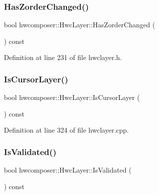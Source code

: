 \subsubsection{\texorpdfstring{Has\+Zorder\+Changed()}{HasZorderChanged()}}
{\footnotesize\ttfamily bool hwcomposer\+::\+Hwc\+Layer\+::\+Has\+Zorder\+Changed (\begin{DoxyParamCaption}{ }\end{DoxyParamCaption}) const\hspace{0.3cm}{\ttfamily [inline]}}



Definition at line 231 of file hwclayer.\+h.


\begin{DoxyCode}{0}
\end{DoxyCode}
\mbox{\label{structhwcomposer_1_1HwcLayer_ac6692424ce0f4839a3e59793cf3efd16}} 
\subsubsection{\texorpdfstring{Is\+Cursor\+Layer()}{IsCursorLayer()}}
{\footnotesize\ttfamily bool hwcomposer\+::\+Hwc\+Layer\+::\+Is\+Cursor\+Layer (\begin{DoxyParamCaption}{ }\end{DoxyParamCaption}) const}



Definition at line 324 of file hwclayer.\+cpp.


\begin{DoxyCode}{0}
\end{DoxyCode}
\mbox{\label{structhwcomposer_1_1HwcLayer_a57e83759a42bcbc3cc2351ab7239bbc5}} 
\subsubsection{\texorpdfstring{Is\+Validated()}{IsValidated()}}
{\footnotesize\ttfamily bool hwcomposer\+::\+Hwc\+Layer\+::\+Is\+Validated (\begin{DoxyParamCaption}{ }\end{DoxyParamCaption}) const\hspace{0.3cm}{\ttfamily [inline]}}

